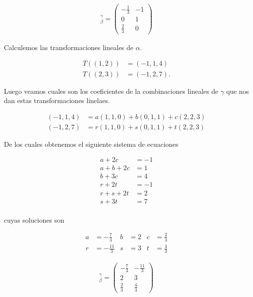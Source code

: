 \documentclass[10pt,a4paper]{article}
\theoremstyle{definition}
\begin{document}
\begin{enumerate}
    \begin{align*}
        [T]^\gamma_\beta = \begin{pmatrix}
            -\frac{1}{3} & -1\\
            0 & 1\\
            \frac{2}{3} & 0
        \end{pmatrix}
    \end{align*}

    Calculemos las transformaciones lineales de $\alpha$.

    \begin{align*}
        T((1,2)) &= (-1,1,4)\\
        T((2,3)) &= (-1,2,7).
    \end{align*}
    
    Luego veamos cuales son los coeficientes de la combinaciones lineales de $\gamma$ que nos dan estas transformaciones linelaes.

    \begin{align*}
        (-1,1,4) &= a(1,1,0) + b(0,1,1) + c(2,2,3)\\
        (-1,2,7) &= r(1,1,0) + s(0,1,1) + t(2,2,3)
    \end{align*}

    De los cuales obtenemos el siguiente sistema de ecuaciones

    \begin{align*}
        a + 2c &= -1\\
        a + b + 2c &= 1\\
        b + 3c &= 4\\
        r + 2t &= -1\\
        r + s + 2t &= 2\\
        s + 3t &= 7\\
    \end{align*}

    cuyas soluciones son

    \begin{align*}
        a &= -\frac{7}{3} & b &= 2 & c &= \frac{2}{3}\\
        r &= -\frac{11}{3} & s &= 3 & t &= \frac{4}{3}
    \end{align*}

    \begin{align*}
        [T]^\gamma_\beta = \begin{pmatrix}
            -\frac{7}{3} & -\frac{11}{3}\\
            2 & 3\\
            \frac{2}{3} & \frac{4}{3}
        \end{pmatrix}
    \end{align*}


\end{enumerate}
\end{document}

